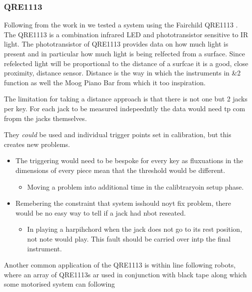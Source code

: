 \subsubsection{QRE1113}\label{qre1113}

Following from the work in \cite{McPherson1} \cite{McPherson2} we tested
a system using the Fairchild QRE1113 \datasheetfigue. The QRE1113 is a
combination infrared LED and phototransistor sensitive to IR light. The
phototransistor of QRE1113 provides data on how much light is present
and in particular how much light is being relfected from a surface.
Since refelected light will be proportional to the distance of a surfcae
it is a good, close proximity, distance sensor. Distance is the way in
which the instruments in \&2 function as well the Moog
Piano Bar from which it too inspiration.

The limitation for taking a distance approach is that there is not one
but 2 jacks per key. For each jack to be measured indepeedntly the data
would need tp com fropm the jacks themselves.

They \emph{could} be used and individual trigger points set in
calibration, but this creates new problems.

\begin{itemize}
\tightlist
\item
  The triggering would need to be bespoke for every key as fluxuations
  in the dimensions of every piece mean that the threshold would be
  different.

  \begin{itemize}
  \tightlist
  \item
    Moving a problem into additional time in the calibtraryoin setup
    phase.
  \end{itemize}
\item
  Remebering the constraint that system isshould noyt fix problem, there
  would be no easy way to tell if a jack had nbot reseated.

  \begin{itemize}
  \tightlist
  \item
    In playing a harpihchord when the jack does not go to its rest
    position, not note would play. This fault should be carried over
    intp the final instrument.
  \end{itemize}
\end{itemize}

Another common application of the QRE1113 is within line following
robots, where an array of QRE1113s ar used in conjunction with black
tape along which some motorised system can following

